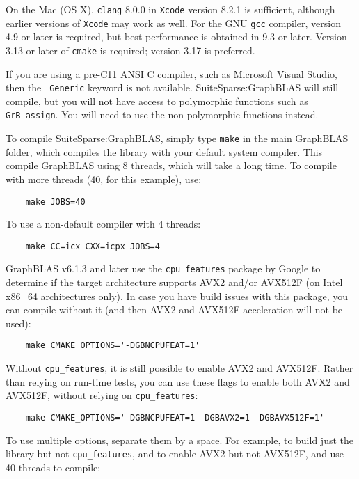 \documentclass[12pt]{article}
\begin{document}
{On the Mac (OS X), \verb'clang' 8.0.0 in \verb'Xcode' version 8.2.1 is
sufficient, although earlier versions of \verb'Xcode' may work as well.  For
the GNU \verb'gcc' compiler, version 4.9 or later is required, but best
performance is obtained in 9.3 or later.  Version 3.13 or later of \verb'cmake'
is required; version 3.17 is preferred.

If you are using a pre-C11 ANSI C compiler, such as Microsoft Visual Studio,
then the \verb'_Generic' keyword is not available.  SuiteSparse:GraphBLAS
will still compile, but you will not have access to polymorphic functions
such as \verb'GrB_assign'.  You will need to use the non-polymorphic functions
instead.

To compile SuiteSparse:GraphBLAS, simply type \verb'make' in the main GraphBLAS
folder, which compiles the library with your default system compiler.  This
compile GraphBLAS using 8 threads, which will take a long time.  To compile with
more threads (40, for this example), use:

    {\small
    \begin{verbatim}
    make JOBS=40 \end{verbatim} }

To use a non-default compiler with 4 threads:

    {\small
    \begin{verbatim}
    make CC=icx CXX=icpx JOBS=4 \end{verbatim} }

GraphBLAS v6.1.3 and later use the \verb'cpu_features' package by Google to
determine if the target architecture supports AVX2 and/or AVX512F (on Intel
x86\_64 architectures only).  In case you have build issues with this package,
you can compile without it (and then AVX2 and AVX512F acceleration will not
be used):

    {\small
    \begin{verbatim}
    make CMAKE_OPTIONS='-DGBNCPUFEAT=1'  \end{verbatim} }

Without \verb'cpu_features', it is still possible to enable AVX2 and AVX512F.
Rather than relying on run-time tests, you can use these flags to enable
both AVX2 and AVX512F, without relying on \verb'cpu_features':

    {\small
    \begin{verbatim}
    make CMAKE_OPTIONS='-DGBNCPUFEAT=1 -DGBAVX2=1 -DGBAVX512F=1' \end{verbatim} }

To use multiple options, separate them by a space.  For example, to build
just the library but not \verb'cpu_features', and to enable
AVX2 but not AVX512F, and use 40 threads to compile:

}
\end{document}
